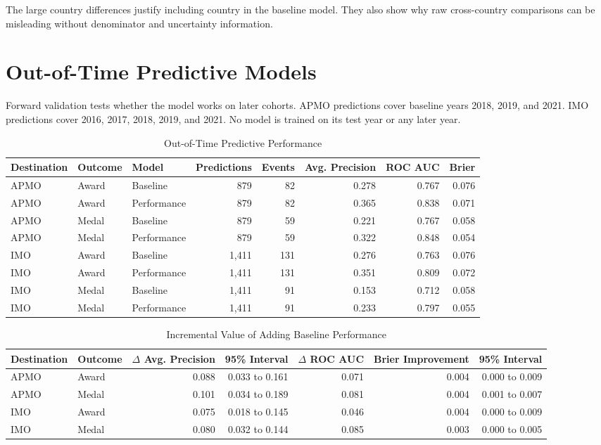 \documentclass[11pt]{article}
\begin{document}
The large country differences justify including country in the baseline model. They also show why raw cross-country comparisons can be misleading without denominator and uncertainty information.

\section{Out-of-Time Predictive Models}

Forward validation tests whether the model works on later cohorts. APMO predictions cover baseline years 2018, 2019, and 2021. IMO predictions cover 2016, 2017, 2018, 2019, and 2021. No model is trained on its test year or any later year.

\begin{table}[H]
\centering
\caption{Out-of-Time Predictive Performance}
\scriptsize
\begin{tabular}{lllrrrrr}
\toprule
Destination & Outcome & Model & Predictions & Events & Avg. Precision & ROC AUC & Brier \\
\midrule
APMO & Award & Baseline & 879 & 82 & 0.278 & 0.767 & 0.076 \\
APMO & Award & Performance & 879 & 82 & 0.365 & 0.838 & 0.071 \\
APMO & Medal & Baseline & 879 & 59 & 0.221 & 0.767 & 0.058 \\
APMO & Medal & Performance & 879 & 59 & 0.322 & 0.848 & 0.054 \\
IMO & Award & Baseline & 1,411 & 131 & 0.276 & 0.763 & 0.076 \\
IMO & Award & Performance & 1,411 & 131 & 0.351 & 0.809 & 0.072 \\
IMO & Medal & Baseline & 1,411 & 91 & 0.153 & 0.712 & 0.058 \\
IMO & Medal & Performance & 1,411 & 91 & 0.233 & 0.797 & 0.055 \\
\bottomrule
\end{tabular}
\end{table}

\begin{table}[H]
\centering
\caption{Incremental Value of Adding Baseline Performance}
\scriptsize
\begin{tabular}{llrrrrr}
\toprule
Destination & Outcome & $\Delta$ Avg. Precision & 95\% Interval & $\Delta$ ROC AUC & Brier Improvement & 95\% Interval \\
\midrule
APMO & Award & 0.088 & 0.033 to 0.161 & 0.071 & 0.004 & 0.000 to 0.009 \\
APMO & Medal & 0.101 & 0.034 to 0.189 & 0.081 & 0.004 & 0.001 to 0.007 \\
IMO & Award & 0.075 & 0.018 to 0.145 & 0.046 & 0.004 & 0.000 to 0.009 \\
IMO & Medal & 0.080 & 0.032 to 0.144 & 0.085 & 0.003 & 0.000 to 0.005 \\
\bottomrule
\end{tabular}
\end{table}
\end{document}
